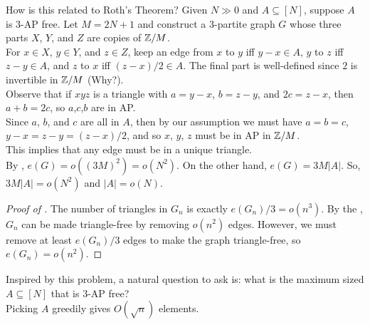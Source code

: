 			How is this related to Roth's Theorem? Given $N\gg 0$ and $A\subseteq[N]$, suppose $A$ is $3$-AP free. Let $M = 2N+1$ and construct a $3$-partite graph $G$ whose three parts $X$, $Y$, and $Z$ are copies of $\mathbb{Z}/M$.\\
			For $x\in X$, $y\in Y$, and $z\in Z$, keep an edge from $x$ to $y$ iff $y-x \in A$, $y$ to $z$ iff $z-y \in A$, and $z$ to $x$ iff $(z-x)/2 \in A$. The final part is well-defined since $2$ is invertible in $\mathbb{Z}/M$ (Why?). \\
			Observe that if $xyz$ is a triangle with $a = y-x$, $b = z-y$, and $2c = z-x$, then $a+b=2c$, so $a$,$c$,$b$ are in AP.\\
			Since $a$, $b$, and $c$ are all in $A$, then by our assumption we must have $a=b=c$, $y-x=z-y=(z-x)/2$, and so $x$, $y$, $z$ must be in AP in $\mathbb{Z}/M$.\\
			This implies that any edge must be in a unique triangle.\\
			By , $e(G) = o((3M)^2) = o(N^2)$. On the other hand, $e(G) = 3M|A|$. So, $3M|A| = o(N^2)$ and $|A| = o(N)$.

			\begin{proof}[Proof of ]
				The number of triangles in $G_n$ is exactly $e(G_n)/3 = o(n^3)$. By the , $G_n$ can be made triangle-free by removing $o(n^2)$ edges. However, we must remove at least $e(G_n)/3$ edges to make the graph triangle-free, so $e(G_n) = o(n^2)$.
			\end{proof}

			Inspired by this problem, a natural question to ask is: what is the maximum sized $A\subseteq[N]$ that is $3$-AP free?\\
			Picking $A$ greedily gives $O(\sqrt{n})$ elements.\\
			
